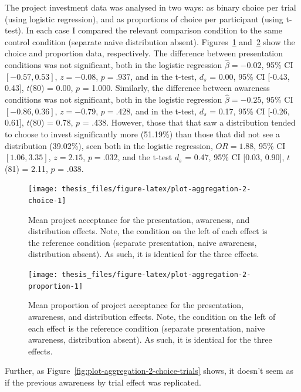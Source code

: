 \documentclass[a4paper, nobind, dvipsnames]{templates/ociamthesis}
\theoremstyle{definition}
\theoremstyle{definition}
\theoremstyle{definition}
\theoremstyle{definition}
\theoremstyle{remark}
\begin{document}
The project investment data was analysed in two ways: as binary choice per trial
(using logistic regression), and as proportions of choice per participant (using
t-test). In each case I compared the relevant comparison condition to the same
control condition (separate naive distribution absent).
Figures~\ref{fig:plot-aggregation-2-choice}
and~\ref{fig:plot-aggregation-2-proportion} show the choice and proportion
data, respectively. The difference between presentation conditions was not
significant, both in the logistic regression
\(\hat{\beta} = -0.02\), 95\% CI \([-0.57, 0.53]\), \(z = -0.08\), \(p = .937\), and in the
t-test, \(d_s\) = 0.00, 95\% CI {[}-0.43, 0.43{]}, \(t\)(80) = 0.00, \(p\) = 1.000. Similarly, the
difference between awareness conditions was not significant, both in the
logistic regression \(\hat{\beta} = -0.25\), 95\% CI \([-0.86, 0.36]\), \(z = -0.79\), \(p = .428\),
and in the t-test, \(d_s\) = 0.17, 95\% CI {[}-0.26, 0.61{]}, \(t\)(80) = 0.78, \(p\) = .438. However,
those that that saw a distribution tended to choose to invest significantly more
(51.19\%) than those that did
not see a distribution
(39.02\%), seen both in the
logistic regression, \(OR = 1.88\), 95\% CI \([1.06, 3.35]\), \(z = 2.15\), \(p = .032\), and the
t-test \(d_s\) = 0.47, 95\% CI {[}0.03, 0.90{]}, \(t\)(81) = 2.11, \(p\) = .038.



\begin{figure}
\texttt{[image: thesis\_files/figure-latex/plot-aggregation-2-choice-1]} \caption{Mean project acceptance for the presentation, awareness, and distribution effects. Note, the condition on the left of each effect is the reference condition (separate presentation, naive awareness, distribution absent). As such, it is identical for the three effects.}\label{fig:plot-aggregation-2-choice}
\end{figure}



\begin{figure}
\texttt{[image: thesis\_files/figure-latex/plot-aggregation-2-proportion-1]} \caption{Mean proportion of project acceptance for the presentation, awareness, and distribution effects. Note, the condition on the left of each effect is the reference condition (separate presentation, naive awareness, distribution absent). As such, it is identical for the three effects.}\label{fig:plot-aggregation-2-proportion}
\end{figure}

Further, as Figure~\ref{fig:plot-aggregation-2-choice-trials} shows, it
doesn't seem as if the previous awareness by trial effect was replicated.
\end{document}
